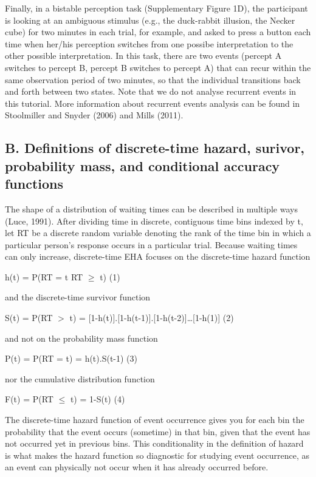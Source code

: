 \documentclass[
  man,floatsintext]{apa6}
\begin{document}
Finally, in a bistable perception task (Supplementary Figure 1D), the participant is looking at an ambiguous stimulus (e.g., the duck-rabbit illusion, the Necker cube) for two minutes in each trial, for example, and asked to press a button each time when her/his perception switches from one possibe interpretation to the other possible interpretation. In this task, there are two events (percept A switches to percept B, percept B switches to percept A) that can recur within the same observation period of two minutes, so that the individual transitions back and forth between two states. Note that we do not analyse recurrent events in this tutorial. More information about recurrent events analysis can be found in Stoolmiller and Snyder (2006) and Mills (2011).

\subsection{B. Definitions of discrete-time hazard, surivor, probability mass, and conditional accuracy functions}\label{b.-definitions-of-discrete-time-hazard-surivor-probability-mass-and-conditional-accuracy-functions}

The shape of a distribution of waiting times can be described in multiple ways (Luce, 1991). After dividing time in discrete, contiguous time bins indexed by t, let RT be a discrete random variable denoting the rank of the time bin in which a particular person's response occurs in a particular trial.
Because waiting times can only increase, discrete-time EHA focuses on the discrete-time hazard function

\noindent h(t) = P(RT = t\textbar{} RT \(\geq\) t) \hfill  (1)

\noindent and the discrete-time survivor function

\noindent S(t) = P(RT \(>\) t) = {[}1-h(t){]}.{[}1-h(t-1){]}.{[}1-h(t-2){]}\ldots{[}1-h(1){]} \hfill  (2)

\noindent and not on the probability mass function

\noindent P(t) = P(RT = t) = h(t).S(t-1) \hfill  (3)

\noindent nor the cumulative distribution function

\noindent F(t) = P(RT \(\leq\) t) = 1-S(t) \hfill  (4)

The discrete-time hazard function of event occurrence gives you for each bin the probability that the event occurs (sometime) in that bin, given that the event has not occurred yet in previous bins. This conditionality in the definition of hazard is what makes the hazard function so diagnostic for studying event occurrence, as an event can physically not occur when it has already occurred before.
\end{document}
